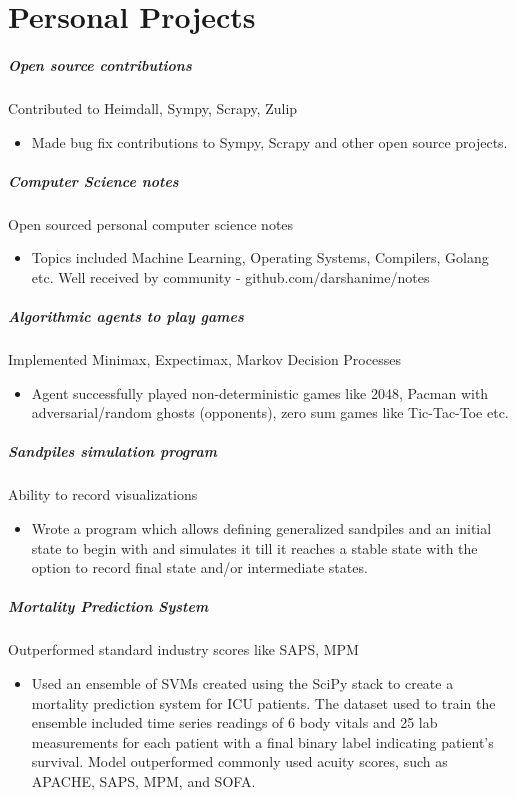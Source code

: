 \documentclass[10pt,letterpaper]{article}
\begin{document}
\section*{Personal Projects}


\subparagraph{Open source contributions}
Contributed to Heimdall, Sympy, Scrapy, Zulip
\begin{itemize}
    \item Made bug fix contributions to Sympy, Scrapy and other open source projects.
\end{itemize}

\subparagraph{Computer Science notes}
Open sourced personal computer science notes 
\begin{itemize}
    \item Topics included Machine Learning, Operating Systems, Compilers, Golang etc. Well received by community - github.com/darshanime/notes
\end{itemize}

\subparagraph{Algorithmic agents to play games}
Implemented Minimax, Expectimax, Markov Decision Processes 
\begin{itemize}
    \item Agent successfully played non-deterministic games like 2048, Pacman with adversarial/random ghosts (opponents), zero sum games like Tic-Tac-Toe etc.
\end{itemize}

\subparagraph{Sandpiles simulation program}
Ability to record visualizations
\begin{itemize}
    \item Wrote a program which allows defining generalized sandpiles and an initial state to begin with and simulates it till it reaches a stable state with the option to record final state and/or intermediate states.
\end{itemize}

\subparagraph{Mortality Prediction System}
Outperformed standard industry scores like SAPS, MPM
\begin{itemize}
    \item Used an ensemble of SVMs created using the SciPy stack to create a mortality prediction system for ICU patients. The dataset used to train the ensemble included time series readings of 6 body vitals and 25 lab measurements for each patient with a final binary label indicating patient's survival. Model outperformed commonly used acuity scores, such as APACHE, SAPS, MPM, and
SOFA.\@
\end{itemize}
\end{document}
